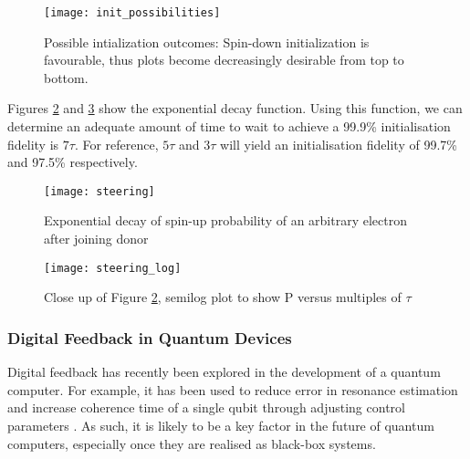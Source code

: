 	\begin{figure}[htbp!]
		\centering
		\texttt{[image: init\_possibilities]}
		\caption[Possible initialisation outcomes]{Possible intialization outcomes: Spin-down initialization is favourable, thus plots become decreasingly desirable from top to bottom.}
		\label{fig::init_possibilities}
	\end{figure}
	
	Figures \ref{fig::spin_steering} and \ref{fig::spin_steering_log} show the exponential decay function. Using this function, we can determine an adequate amount of time to wait to achieve a 99.9\% initialisation fidelity is $7 \tau$. For reference, $5 \tau$ and $3 \tau$ will yield an initialisation fidelity of 99.7\% and 97.5\% respectively.
	
	\begin{figure}[htbp!]
		\centering
		\texttt{[image: steering]}
		\caption{Exponential decay of spin-up probability of an arbitrary electron after joining donor}
		\label{fig::spin_steering}
	\end{figure}
	
	
	\begin{figure}[htbp!]
		\centering
		\texttt{[image: steering\_log]}
		\caption{Close up of Figure \ref{fig::spin_steering}, semilog plot to show P versus multiples of $\tau$}
		\label{fig::spin_steering_log}
	\end{figure}


\subsubsection{Digital Feedback in Quantum Devices}

Digital feedback has recently been explored in the development of a quantum computer. For example, it has been used to reduce error in resonance estimation \cite{bonato2015optimized} and increase coherence time of a single qubit through adjusting control parameters \cite{shulman2014suppressing}. As such, it is likely to be a key factor in the future of quantum computers, especially once they are realised as black-box systems.
